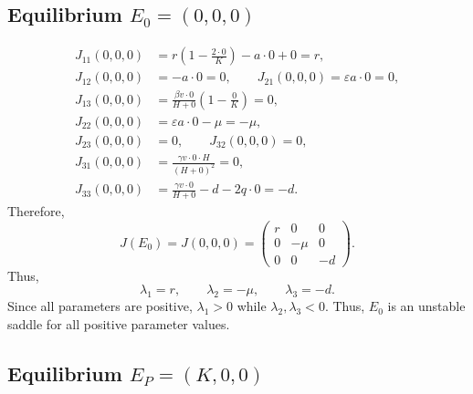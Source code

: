 \documentclass[11pt]{article}
\begin{document}
\subsection{Equilibrium $E_0=(0,0,0)$}


\begin{align*}
    J_{11}(0,0,0)
        &= r\left(1-\frac{2\cdot 0}{K}\right)-a\cdot 0+0=r, \\
    J_{12}(0,0,0) &= -a\cdot 0=0,
        \qquad J_{21}(0,0,0)=\varepsilon a\cdot 0=0, \\
    J_{13}(0,0,0)
        &= \frac{\beta v\cdot 0}{H+0}\left(1-\frac{0}{K}\right)=0, \\
    J_{22}(0,0,0) &= \varepsilon a\cdot 0-\mu=-\mu, \\
    J_{23}(0,0,0) &= 0,\qquad J_{32}(0,0,0)=0, \\
    J_{31}(0,0,0) &= \frac{\gamma v\cdot 0\cdot H}{(H+0)^2}=0, \\
    J_{33}(0,0,0) &= \frac{\gamma v\cdot 0}{H+0}-d-2q\cdot 0=-d.
\end{align*}
Therefore,
\[
    J(E_0)=J(0,0,0)=
    \begin{pmatrix}
        r & 0 & 0 \\
        0 & -\mu & 0 \\
        0 & 0 & -d
    \end{pmatrix}.
\]
Thus,
\[
    \lambda_1=r,\qquad \lambda_2=-\mu,\qquad \lambda_3=-d.
\]
Since all parameters are positive, $\lambda_1>0$ while
$\lambda_2,\lambda_3<0$. Thus, $E_0$ is an unstable saddle for all positive
parameter values.

\subsection{Equilibrium $E_P=(K,0,0)$}
\end{document}
